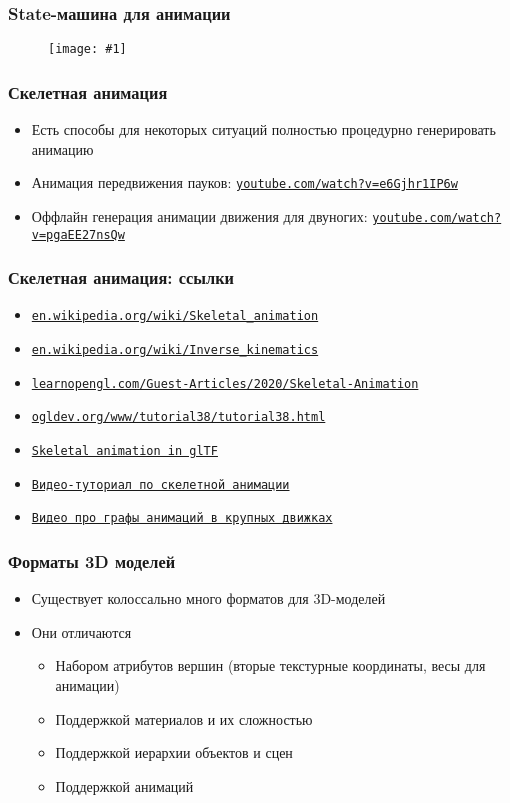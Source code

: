 \documentclass[10pt]{beamer}
\newcommand{\slideimage}[1]{
  \begin{figure}
    \begin{adjustbox}{width=\textwidth, totalheight=\textheight-2\baselineskip-2\baselineskip,keepaspectratio}
      \texttt{[image: \#1]}
    \end{adjustbox}
  \end{figure}
}
\begin{document}
\begin{frame}[fragile]
\frametitle{State-машина для анимации}
\slideimage{state-machine.png}
\end{frame}

\begin{frame}[fragile]
\frametitle{Скелетная анимация}
\begin{itemize}
\item Есть способы для некоторых ситуаций полностью процедурно генерировать анимацию
\pause
\item Анимация передвижения пауков: \href{https://www.youtube.com/watch?v=e6Gjhr1IP6w}{\texttt{youtube.com/watch?v=e6Gjhr1IP6w}}
\pause
\item Оффлайн генерация анимации движения для двуногих: \href{https://www.youtube.com/watch?v=pgaEE27nsQw}{\texttt{youtube.com/watch?v=pgaEE27nsQw}}
\end{itemize}
\end{frame}

\begin{frame}[fragile]
\frametitle{Скелетная анимация: ссылки}
\begin{itemize}
\item \href{https://en.wikipedia.org/wiki/Skeletal_animation}{\texttt{en.wikipedia.org/wiki/Skeletal\_animation}}
\item \href{https://en.wikipedia.org/wiki/Inverse_kinematics}{\texttt{en.wikipedia.org/wiki/Inverse\_kinematics}}
\item \href{https://learnopengl.com/Guest-Articles/2020/Skeletal-Animation}{\texttt{learnopengl.com/Guest-Articles/2020/Skeletal-Animation}}
\item \href{https://ogldev.org/www/tutorial38/tutorial38.html}{\texttt{ogldev.org/www/tutorial38/tutorial38.html}}
\item \href{https://lisyarus.github.io/blog/graphics/2023/07/03/gltf-animation.html}{\texttt{Skeletal animation in glTF}}
\item \href{https://www.youtube.com/watch?v=f3Cr8Yx3GGA}{\texttt{Видео-туториал по скелетной анимации}}
\item \href{https://www.youtube.com/watch?v=R-T3Mk5oDHI}{\texttt{Видео про графы анимаций в крупных движках}}
\end{itemize}
\end{frame}

\begin{frame}[fragile]
\frametitle{Форматы 3D моделей}
\begin{itemize}
\item Существует колоссально много форматов для 3D-моделей
\pause
\item Они отличаются
\pause
\begin{itemize}
\item Набором атрибутов вершин (вторые текстурные координаты, весы для анимации)
\pause
\item Поддержкой материалов и их сложностью
\pause
\item Поддержкой иерархии объектов и сцен
\pause
\item Поддержкой анимаций
\end{itemize}
\end{itemize}
\end{frame}
\end{document}
